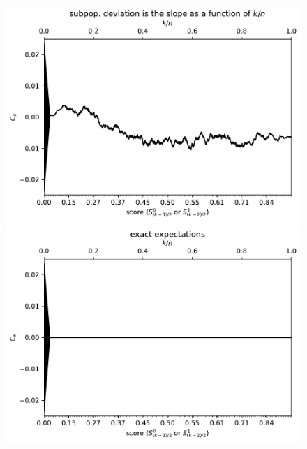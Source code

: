 \documentclass{article}
\newlength{\vertsep}
\newlength{\imsize}
\begin{document}
\begin{figure}
\begin{centering}

\parbox{\imsize}{\includegraphics[width=\imsize]
{../codes/unweighted/10000_7000_10_3/cumulative.pdf}}
\quad\quad
\parbox{\imsize}{\includegraphics[width=\imsize]
{../codes/unweighted/10000_7000_10_3/cumulative_exact.pdf}}

\vspace{\vertsep}


\end{centering}
\end{figure}
\end{document}
